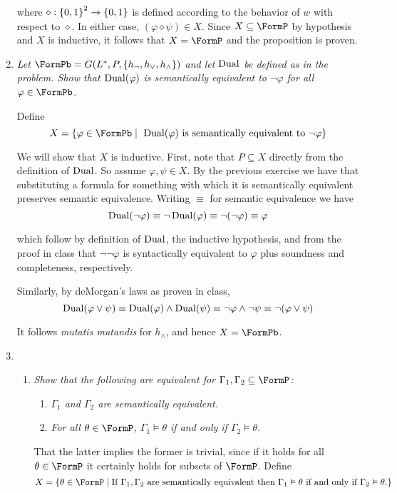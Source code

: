 \documentclass[10pt]{article}
\begin{document}
\begin{enumerate}
where $\diamond: \left\{ 0,1 \right\}^2 \to \left\{ 0,1 \right\}$ is defined according to the behavior of $w$ with respect to $\diamond$.  In either case, $(\varphi \diamond \psi) \in X$.  Since $X \subseteq \FormP$ by hypothesis and $X$ is inductive, it follows that $X = \FormP$ and the proposition is proven.

\item \emph{Let $\FormPb = G(L^\ast, P, \set{h_{\neg}, h_{\lor}, h_{\land}})$ and let $\operatorname{Dual}$ be defined as in the problem.  Show that $\operatorname{Dual}(\varphi)$ is semantically equivalent to $\neg \varphi$ for all $\varphi \in \FormPb$.}

Define
\[
X = \set{\varphi \in \FormPb \mid \ \Dual(\varphi) \mbox{ is semantically equivalent to } \neg\varphi}
\]

We will show that $X$ is inductive.  First, note that $P \subseteq X$ directly from the definition of $\operatorname{Dual}$.  So assume $\varphi, \psi \in X$.  By the previous exercise we have that substituting a formula for something with which it is semantically equivalent preserves semantic equivalence.  Writing $\equiv$ for semantic equivalence we have
\[
\operatorname{Dual}(\neg\varphi) \equiv \neg\operatorname{Dual}(\varphi) \equiv \neg(\neg\varphi) \equiv \varphi
\]

which follow by definition of $\operatorname{Dual}$, the inductive hypothesis, and from the proof in class that $\neg\neg\varphi$ is syntactically equivalent to $\varphi$ plus soundness and completeness, respectively.

Similarly, by deMorgan's laws as proven in class,
\[
\operatorname{Dual}(\varphi \lor \psi) \equiv \operatorname{Dual}(\varphi) \land \operatorname{Dual}(\psi) \equiv \neg\varphi \land \neg\psi \equiv \neg(\varphi \lor \psi)
\]

It follows \emph{mutatis mutandis} for $h_{\land}$, and hence $X = \FormPb$.
\item
\begin{enumerate}
\item \emph{Show that the following are equivalent for $\Gamma_1, \Gamma_2 \subseteq \FormP$:}
\begin{enumerate}
\item \emph{$\Gamma_1$ and $\Gamma_2$ are semantically equivalent.}
\item \emph{For all $\theta \in \FormP$, $\Gamma_1 \vDash \theta$ if and only if $\Gamma_2 \vDash \theta$.}
\end{enumerate}

That the latter implies the former is trivial, since if it holds for all $\theta \in \FormP$ it certainly holds for subsets of $\FormP$.  Define
\[
X = \set{\theta \in \FormP \mid \mbox{If $\Gamma_1, \Gamma_2$ are semantically equivalent then $\Gamma_1 \vDash \theta$ if and only if $\Gamma_2 \vDash \theta$.}}
\]


\end{enumerate}
\end{enumerate}
\end{document}
